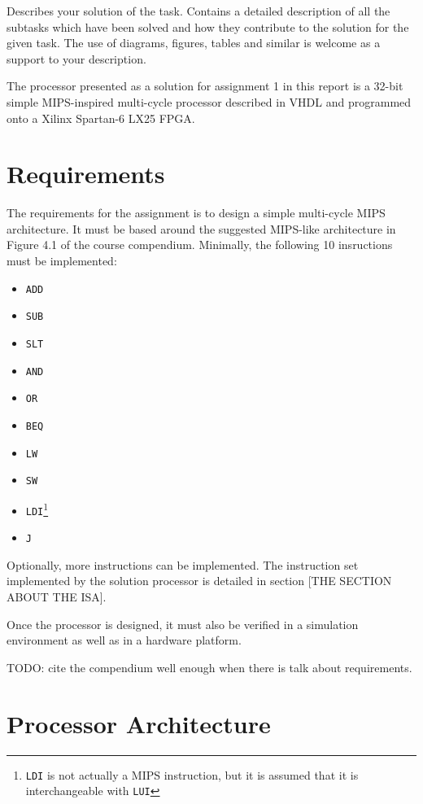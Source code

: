 Describes your solution of the task.
Contains a detailed description of all the subtasks which have been solved and how they contribute to the solution for the given task.
The use of diagrams, figures, tables and similar is welcome as a support to your description.

The processor presented as a solution for assignment 1 in this report is a 32-bit simple MIPS-inspired multi-cycle processor described in VHDL and programmed onto a Xilinx Spartan-6 LX25 FPGA.

\section{Requirements}

The requirements for the assignment is to design a simple multi-cycle MIPS architecture.
It must be based around the suggested MIPS-like architecture in Figure 4.1 of the course compendium\cite{compendium}.
Minimally, the following 10 insructions must be implemented:

\begin{itemize}

\item{\texttt{ADD}}
\item{\texttt{SUB}}
\item{\texttt{SLT}}
\item{\texttt{AND}}
\item{\texttt{OR}}
\item{\texttt{BEQ}}
\item{\texttt{LW}}
\item{\texttt{SW}}
\item{\texttt{LDI}\footnote{\texttt{LDI} is not actually a MIPS instruction, but it is assumed that it is interchangeable with \texttt{LUI}}}
\item{\texttt{J}}

\end{itemize}

Optionally, more instructions can be implemented.
The instruction set implemented by the solution processor is detailed in section [THE SECTION ABOUT THE ISA].

Once the processor is designed, it must also be verified in a simulation environment as well as in a hardware platform.

TODO: cite the compendium well enough when there is talk about requirements.

\section{Processor Architecture}

